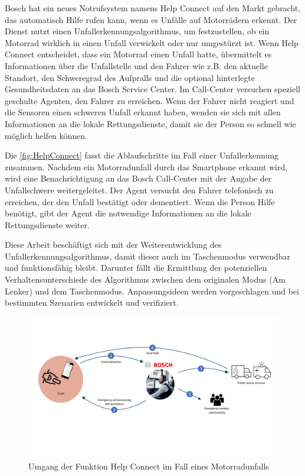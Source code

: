 Bosch hat ein neues Notrufsystem namens \glqq Help Connect\grqq{} auf den Markt gebracht, das automatisch Hilfe rufen kann, wenn es Unfälle auf Motorrädern erkennt.
Der Dienst nutzt einen Unfallerkennungsalgorithmus, um festzustellen, ob ein Motorrad wirklich in einen Unfall verwickelt oder nur umgestürzt ist.
Wenn \glqq Help Connect\grqq{} entscheidet, dass ein Motorrad einen Unfall hatte, übermittelt es Informationen über die Unfallstelle und den Fahrer wie z.B. den aktuelle Standort, den Schweregrad des Aufpralls und die optional hinterlegte Gesundheitsdaten an das Bosch Service Center.
Im Call-Center versuchen speziell geschulte Agenten, den Fahrer zu erreichen. Wenn der Fahrer nicht reagiert und die Sensoren einen schweren Unfall erkannt haben, wenden sie sich mit allen Informationen an die lokale Rettungsdienste, damit sie der Person so schnell wie möglich helfen können.

Die \autoref{fig:HelpConnect} fasst die Ablaufschritte im Fall einer Unfallerkennung zusammen. Nachdem ein Motorradunfall durch das Smartphone erkannt wird, wird eine Benachrichtigung an das Bosch Call-Center mit der Angabe der Unfallschwere weitergeleitet. Der Agent versucht den Fahrer telefonisch zu erreichen, der den Unfall bestätigt oder dementiert. Wenn die Person Hilfe benötigt, gibt der Agent die notwendige Informationen an die lokale Rettungsdienste weiter.

Diese Arbeit beschäftigt sich mit der Weiterentwicklung des Unfallerkennungsalgorithmus, damit dieser auch im Taschenmodus verwendbar und funktionsfähig bleibt. Darunter fällt die Ermittlung der potenziellen Verhaltensunterschiede des Algorithmus zwischen dem originalen Modus (Am Lenker) und dem Taschenmodus. Anpassungsideen werden vorgeschlagen und bei bestimmten Szenarien entwickelt und verifiziert.

\begin{figure}[htpb]
	\centering
	\includegraphics[width=\linewidth]{Bilder/HelpConnect.pdf}
	\caption{Umgang der Funktion \glqq Help Connect\grqq{} im Fall eines Motorradunfalls}
	\label{fig:HelpConnect}
\end{figure}













